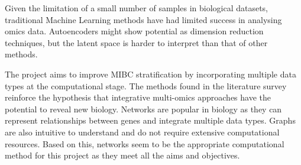 Given the limitation of a small number of samples in biological datasets, traditional Machine Learning methods have had limited success in analysing omics data. Autoencoders might show potential as dimension reduction techniques, but the latent space is harder to interpret than that of other methods.

The project aims to improve MIBC stratification by incorporating multiple data types at the computational stage. The methods found in the literature survey reinforce the hypothesis that integrative multi-omics approaches have the potential to reveal new biology. Networks are popular in biology as they can represent relationships between genes and integrate multiple data types. Graphs are also intuitive to understand and do not require extensive computational resources. Based on this, networks seem to be the appropriate computational method for this project as they meet all the aims and objectives.